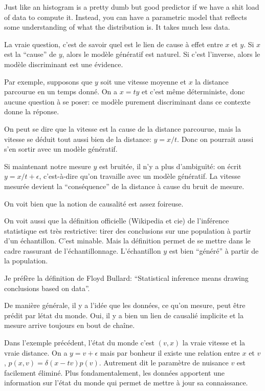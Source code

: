 \documentclass{article}
\begin{document}
Just like an histogram is a pretty dumb but good predictor if we have a shit load of data to compute it. Instead, you can have a parametric model that reflects some understanding of what the distribution is. It takes much less data.

La vraie question, c'est de savoir quel est le lien de cause \`a effet entre $x$ et $y$. Si $x$ est la ``cause'' de $y$, alors le mod\`ele g\'en\'eratif est naturel. Si c'est l'inverse, alors le mod\`ele discriminant est une \'evidence.

Par exemple, supposons que $y$ soit une vitesse moyenne et $x$ la distance parcourue en un temps donn\'e. On a $x=t y$ et c'est m\^eme d\'eterministe, donc aucune question \`a se poser: ce mod\`ele purement discriminant dans ce contexte donne la r\'eponse.

On peut se dire que la vitesse est la cause de la distance parcourue, mais la vitesse se d\'eduit tout aussi bien de la distance: $y=x/t$. Donc on pourrait aussi s'en sortir avec un mod\`ele g\'en\'eratif.

Si maintenant notre mesure $y$ est bruit\'ee, il n'y a plus d'ambigu\"it\'e: on \'ecrit $y=x/t+\epsilon$, c'est-\`a-dire qu'on travaille avec un mod\`ele g\'en\'eratif. La vitesse mesur\'ee devient la ``cons\'equence'' de la distance \`a cause du bruit de mesure.

On voit bien que la notion de causalit\'e est assez foireuse.

On voit aussi que la d\'efinition officielle (Wikipedia et cie) de l'inf\'erence statistique est tr\`es restrictive: tirer des conclusions sur une population \`a partir d'un \'echantillon. C'est minable. Mais la d\'efinition permet de se mettre dans le cadre rassurant de l'\'echantillonnage. L'\'echantillon $y$ est bien ``g\'en\'er\'e'' \`a partir de la population.

Je pr\'ef\`ere la d\'efinition de Floyd Bullard: ``Statistical inference means drawing conclusions based on data''.

De mani\`ere g\'en\'erale, il y a l'id\'ee que les donn\'ees, ce qu'on mesure, peut \^etre pr\'edit par l\'etat du monde. Oui, il y a bien un lien de causali\'e implicite et la mesure arrive toujours en bout de cha\^ine.

Dans l'exemple pr\'ec\'edent, l'\'etat du monde c'est $(v,x)$ la vraie vitesse et la vraie distance. On a $y=v+\epsilon$ mais par bonheur il existe une relation entre $x$ et $v$, 
$p(x,v)=\delta(x-tv)p(v)$. Autrement dit le param\`etre de nuisance $v$ est facilement \'elimin\'e. Plus fondamentalement, les donn\'ees apportent une information sur l'\'etat du monde qui permet de mettre \`a jour sa connaissance.
\end{document}
